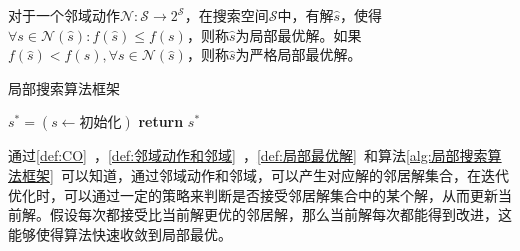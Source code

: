 \par
\begin{definition}
    \label{def:局部最优解}
    对于一个邻域动作$\mathcal{N}:\mathcal{S} \rightarrow 2^{\mathcal{S}}$，在搜索空间$\mathcal{S}$中，有解$\hat{s}$，使得$\forall s \in \mathcal{N}(\hat{s}) : f(\hat{s}) \leq f(s)$，则称$\hat{s}$为局部最优解。如果$f(\hat{s}) < f(s), \forall s \in \mathcal{N}(\hat{s})$，则称$\hat{s}$为严格局部最优解。
\end{definition}
\par
\begin{algorithm}
    \caption{局部搜索算法框架}
    \label{alg:局部搜索算法框架}
    \BlankLine
    $s^* = (s \leftarrow \text{初始化})$ \;
    \textbf{return } $s^*$ \;
\end{algorithm}
\par
通过\autoref{def:CO}~，\autoref{def:邻域动作和邻域}~，\autoref{def:局部最优解}~和算法\ref{alg:局部搜索算法框架}~可以知道，通过邻域动作和邻域，可以产生对应解的邻居解集合，在迭代优化时，可以通过一定的策略来判断是否接受邻居解集合中的某个解，从而更新当前解。假设每次都接受比当前解更优的邻居解，那么当前解每次都能得到改进，这能够使得算法快速收敛到局部最优。

